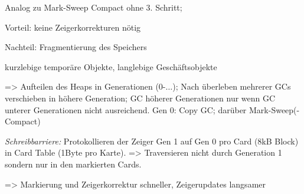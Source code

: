 Analog zu Mark-Sweep Compact ohne 3. Schritt; 

Vorteil: keine Zeigerkorrekturen nötig

Nachteil: Fragmentierung des Speichers

kurzlebige temporäre Objekte, langlebige Geschäftsobjekte

=> Aufteilen des Heaps in Generationen (0-$\dots$); Nach überleben mehrerer GCs verschieben in höhere Generation; GC höherer Generationen nur wenn GC unterer Generationen nicht ausreichend. Gen 0: Copy GC; darüber Mark-Sweep(-Compact)

\textit{Schreibbarriere:} Protokollieren der Zeiger Gen 1 auf Gen 0 pro Card (8kB Block) in Card Table (1Byte pro Karte). => Traversieren nicht durch Generation 1 sondern nur in den markierten Cards. 

=> Markierung und Zeigerkorrektur schneller, Zeigerupdates langsamer


